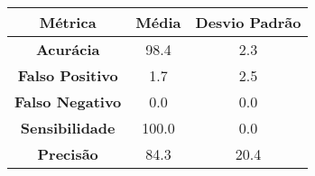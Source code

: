 \begin{tabular}{|c|c|c|}%
\hline%
\textbf{Métrica}&\textbf{Média}&\textbf{Desvio Padrão}\\%
\hline%
\textbf{Acurácia}&98.4&2.3\\%
\hline%
\textbf{Falso Positivo}&1.7&2.5\\%
\hline%
\textbf{Falso Negativo}&0.0&0.0\\%
\hline%
\textbf{Sensibilidade}&100.0&0.0\\%
\hline%
\textbf{Precisão}&84.3&20.4\\%
\hline%
\end{tabular}